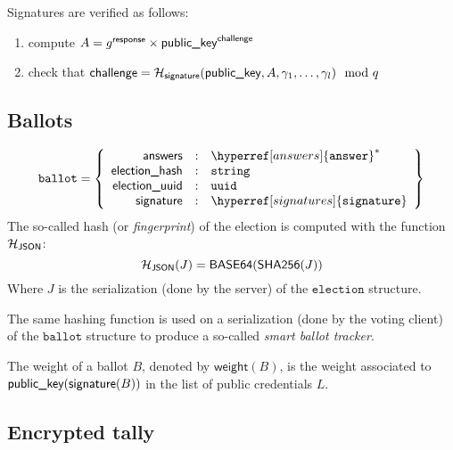 \documentclass[a4paper]{article}
\newcommand{\basesixfour}{\textsf{BASE64}}
\newcommand{\shatwo}{\textsf{SHA256}}
\newcommand{\jstring}{\texttt{string}}
\newcommand{\uuid}{\texttt{uuid}}
\newcommand{\election}{\texttt{election}}
\newcommand{\ballot}{\texttt{ballot}}
\begin{document}
Signatures are verified as follows:
\begin{enumerate}
\item compute $A=g^{\textsf{response}}\times \textsf{public\_key}^{\textsf{challenge}}$
\item check that $\textsf{challenge}=\mathcal{H}_{\textsf{signature}}(\textsf{public\_key},A,\gamma_1,\dots,\gamma_l)\mod q$
\end{enumerate}

\subsection{Ballots}
\label{ballots}

\newcommand{\json}{\textsf{JSON}}

\begin{gather*}
  \ballot=\left\{
    \begin{array}{rcl}
      \answers&:&\hyperref[answers]{\answer}^\ast\\
      \textsf{election\_hash}&:&\jstring\\
      \textsf{election\_uuid}&:&\uuid\\
      \siglabel&:&\hyperref[signatures]{\signature}
    \end{array}
  \right\}
\end{gather*}
The so-called hash (or \emph{fingerprint}) of the election
is computed with the function $\Hash_\json$:
\[
\Hash_\json(J)=\basesixfour(\shatwo(J))
\]
Where $J$ is the serialization (done by the server) of the $\election$
structure.

The same hashing function is used on a serialization (done by the
voting client) of the $\ballot$ structure to produce a so-called
\emph{smart ballot tracker}.

The weight of a ballot $B$, denoted by $\textsf{weight}(B)$, is the
weight associated to $\textsf{public\_key}(\textsf{signature}(B))$ in the list of public
credentials $L$.

\subsection{Encrypted tally}
\label{tally}
\end{document}
